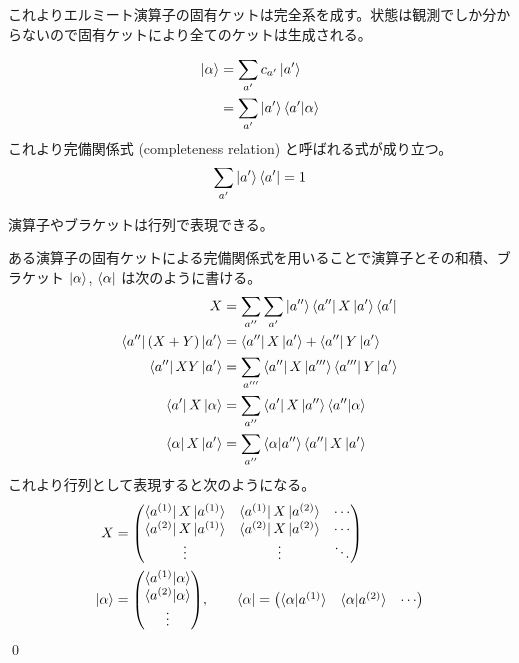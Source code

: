 \documentclass[uplatex,dvipdfmx,a4paper,11pt]{jlreq}
\makeatletter
\theoremstyle{definition}
\renewenvironment{proof}[1][\proofname]{\par
  \normalfont
  \topsep6\p@\@plus6\p@ \trivlist
  \item[\hskip\labelsep{\bfseries #1}\@addpunct{\bfseries}]\ignorespaces\quad\par
}{%
  \qed\endtrivlist\@endpefalse
}
\renewcommand\proofname{証明}
\makeatother
\begin{document}
これよりエルミート演算子の固有ケットは完全系を成す。状態は観測でしか分からないので固有ケットにより全てのケットは生成される。

\begin{align}
  \ket{\alpha} & = \sum_{a'}c_{a'}\ket{a'}             \\
               & = \sum_{a'}\ket{a'}\braket{a'|\alpha}
\end{align}
これより完備関係式 (completeness relation) と呼ばれる式が成り立つ。
\begin{align}
  \sum_{a'}\ket{a'}\bra{a'} = 1
\end{align}

\begin{proposition}[行列表現]
  演算子やブラケットは行列で表現できる。
\end{proposition}
\begin{proof}
  ある演算子の固有ケットによる完備関係式を用いることで演算子とその和積、ブラケット $\ket{\alpha}$, $\bra{\alpha}$ は次のように書ける。
  \begin{align}
    X                        & = \sum_{a''}\sum_{a'}\ket{a''}\bra{a''}X\ket{a'}\bra{a'} \\
    \bra{a''}(X + Y)\ket{a'} & = \bra{a''}X\ket{a'} + \bra{a''}Y\ket{a'}                \\
    \bra{a''}XY\ket{a'}      & = \sum_{a'''}\bra{a''}X\ket{a'''}\bra{a'''}Y\ket{a'}     \\
    \bra{a'}X\ket{\alpha}    & = \sum_{a''}\bra{a'}X\ket{a''}\braket{a''|\alpha}        \\
    \bra{\alpha}X\ket{a'}    & = \sum_{a''}\braket{\alpha|a''}\bra{a''}X\ket{a'}
  \end{align}
  これより行列として表現すると次のようになる。
  \begin{align}
    X                                            & = \mqty(\bra{a^{(1)}}X\ket{a^{(1)}} & \bra{a^{(1)}}X\ket{a^{(2)}} & \cdots \\
    \bra{a^{(2)}}X\ket{a^{(1)}}                  & \bra{a^{(2)}}X\ket{a^{(2)}}         & \cdots                               \\
    \vdots                                       & \vdots                              & \ddots)                              \\
    \ket{\alpha}                                 & = \mqty(\braket{a^{(1)}|\alpha}                                            \\ \braket{a^{(2)}|\alpha} \\ \vdots), \qquad
    \bra{\alpha} = \mqty(\braket{\alpha|a^{(1)}} & \braket{\alpha|a^{(2)}}             & \cdots)
  \end{align}
\end{proof}
\end{document}
